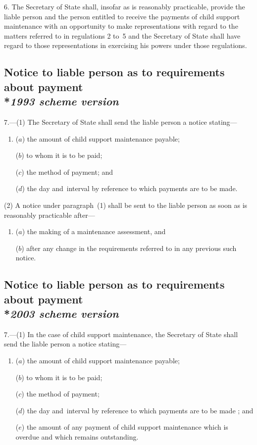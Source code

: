 \documentclass[12pt,a4paper]{article}
\begin{document}
6.  The Secretary of State shall, insofar as is reasonably practicable, provide the liable person and the person entitled to receive the payments of child support maintenance with an opportunity to make representations with regard to the matters referred to in regulations 2 to~5 and the Secretary of State shall have regard to those representations in exercising his powers under those regulations.

\subsection[7. Notice to liable person as to requirements about payment --- \emph{1993 scheme version}]{Notice to liable person as to requirements about payment\\*\emph{1993 scheme version}}

7.—(1) The Secretary of State shall send the liable person a notice stating—
\begin{enumerate}\item[]
($a$) the amount of child support maintenance payable;

($b$) to whom it is to be paid;

($c$) the method of payment; and

($d$) the day and~interval by reference to which payments are to be made.
\end{enumerate}

(2) A notice under paragraph~(1) shall be sent to the liable person as soon as is reasonably practicable after—
\begin{enumerate}\item[]
($a$) the making of a maintenance assessment, and

($b$) after any change in the requirements referred to in any previous such notice.
\end{enumerate}

\subsection[7. Notice to liable person as to requirements about payment --- \emph{2003 scheme version}]{Notice to liable person as to requirements about payment\\*\emph{2003 scheme version}}

7.—(1) 
In the case of child support maintenance,  %
the Secretary of State shall send the liable person a notice stating—
\begin{enumerate}\item[]
($a$) the amount of child support maintenance payable;

($b$) to whom it is to be paid;

($c$) the method of payment; 

($d$) the day and~interval by reference to which payments are to be made%
; and

($e$) the amount of any payment of child support maintenance which is overdue and which remains outstanding.
\end{enumerate}
\end{document}
